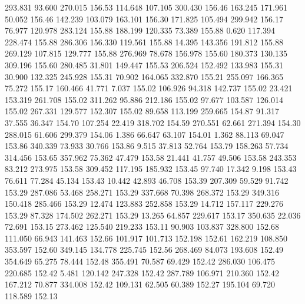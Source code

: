  293.831   93.600  270.015       156.53
 114.648  107.105  300.430       156.46
 163.245  171.961   50.052       156.46
 142.239  103.079  163.101       156.30
 171.825  105.494  299.942       156.17
  76.977  120.978  283.124       155.88
 188.199  120.335   73.389       155.88
   0.620  117.394  228.474       155.88
 286.306  156.330  119.561       155.88
  14.395  143.356  191.812       155.88
 269.129  107.815  129.777       155.88
 276.969   78.678  156.978       155.60
 180.373  130.135  309.196       155.60
 280.485   31.801  149.447       155.53
 206.524  152.492  133.983       155.31
  30.900  132.325  245.928       155.31
  70.902  164.065  332.870       155.21
 255.097  166.365   75.272       155.17
 160.466   41.771    7.037       155.02
 106.926   94.318  142.737       155.02
  23.421  153.319  261.708       155.02
 311.262   95.886  212.186       155.02
  97.677  103.587  126.014       155.02
 267.331  129.577  152.307       155.02
  89.658  113.199  259.665       154.87
  91.317   37.555   36.347       154.70
 107.254   22.419  318.702       154.59
 270.551   62.661  271.394       154.30
 288.015   61.606  299.379       154.06
   1.386   66.647   63.107       154.01
   1.362   88.113   69.047       153.86
 340.339   73.933   30.766       153.86
   9.515   37.813   52.764       153.79
 158.263   57.734  314.456       153.65
 357.962   75.362   47.479       153.58
  21.441   41.757   49.506       153.58
 243.353   83.212  273.975       153.58
 309.452  117.195  185.932       153.45
  97.740   17.342    9.198       153.43
  76.611   77.284   45.134       153.43
  10.442   42.893   46.708       153.39
 207.309   59.529   91.742       153.29
 287.086   53.468  258.271       153.29
 337.668   70.398  268.372       153.29
 349.316  150.418  285.466       153.29
  12.474  123.883  252.858       153.29
  14.712  157.117  229.276       153.29
  87.328  174.502  262.271       153.29
  13.265   64.857  229.617       153.17
 350.635   22.036   72.691       153.15
 273.462  125.540  219.233       153.11
  90.903  103.837  328.800       152.68
 111.050   66.943  141.463       152.66
 101.917  101.713  152.198       152.61
 162.219  108.850  353.597       152.60
 349.145  134.778  225.745       152.56
 268.469   84.073  193.608       152.49
 354.649   65.275   78.444       152.48
 355.491   70.587   69.429       152.42
 286.030  106.475  220.685       152.42
   5.481  120.142  247.328       152.42
 287.789  106.971  210.360       152.42
 167.212   70.877  334.008       152.42
 109.131   62.505   60.389       152.27
 195.104   69.720  118.589       152.13
